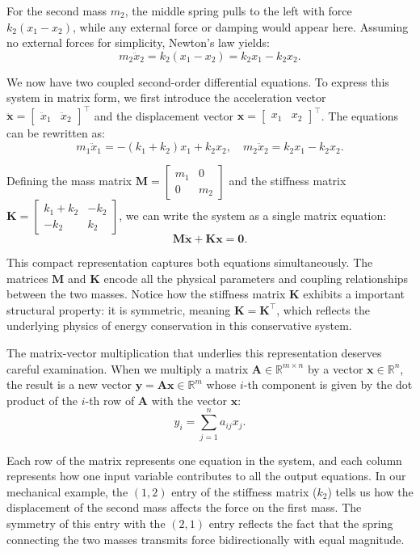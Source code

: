 For the second mass $m_2$, the middle spring pulls to the left with force $k_2(x_1 - x_2)$, while any external force or damping would appear here. Assuming no external forces for simplicity, Newton's law yields:
\[
m_2 \ddot{x}_2 = k_2(x_1 - x_2) = k_2 x_1 - k_2 x_2.
\]

We now have two coupled second-order differential equations. To express this system in matrix form, we first introduce the acceleration vector $\ddot{\mathbf{x}} = \begin{bmatrix} \ddot{x}_1 & \ddot{x}_2 \end{bmatrix}^\top$ and the displacement vector $\mathbf{x} = \begin{bmatrix} x_1 & x_2 \end{bmatrix}^\top$. The equations can be rewritten as:
\[
m_1 \ddot{x}_1 = -(k_1 + k_2)x_1 + k_2 x_2, \quad
m_2 \ddot{x}_2 = k_2 x_1 - k_2 x_2.
\]

Defining the mass matrix $\mathbf{M} = \begin{bmatrix} m_1 & 0 \\ 0 & m_2 \end{bmatrix}$ and the stiffness matrix $\mathbf{K} = \begin{bmatrix} k_1 + k_2 & -k_2 \\ -k_2 & k_2 \end{bmatrix}$, we can write the system as a single matrix equation:
\[
\mathbf{M} \ddot{\mathbf{x}} + \mathbf{K} \mathbf{x} = \mathbf{0}.
\]

This compact representation captures both equations simultaneously. The matrices $\mathbf{M}$ and $\mathbf{K}$ encode all the physical parameters and coupling relationships between the two masses. Notice how the stiffness matrix $\mathbf{K}$ exhibits a important structural property: it is symmetric, meaning $\mathbf{K} = \mathbf{K}^\top$, which reflects the underlying physics of energy conservation in this conservative system.

The matrix-vector multiplication that underlies this representation deserves careful examination. When we multiply a matrix $\mathbf{A} \in \mathbb{R}^{m \times n}$ by a vector $\mathbf{x} \in \mathbb{R}^n$, the result is a new vector $\mathbf{y} = \mathbf{A}\mathbf{x} \in \mathbb{R}^m$ whose $i$-th component is given by the dot product of the $i$-th row of $\mathbf{A}$ with the vector $\mathbf{x}$:
\[
y_i = \sum_{j=1}^n a_{ij} x_j.
\]

Each row of the matrix represents one equation in the system, and each column represents how one input variable contributes to all the output equations. In our mechanical example, the $(1,2)$ entry of the stiffness matrix ($k_2$) tells us how the displacement of the second mass affects the force on the first mass. The symmetry of this entry with the $(2,1)$ entry reflects the fact that the spring connecting the two masses transmits force bidirectionally with equal magnitude.

